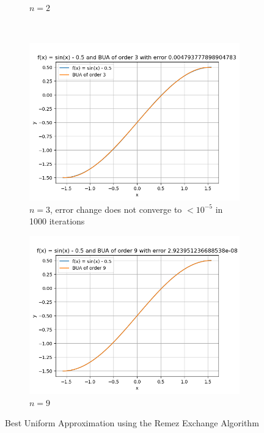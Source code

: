 \documentclass[conference,onecolumn]{IEEEtran}
\begin{document}
\begin{enumerate}[label=\arabic{enumi}.]
\begin{enumerate}
\begin{figure}[H]
\begin{subfigure}{0.49\linewidth}
                                    \caption{$n = 2$}
                              \end{subfigure} \\
                              \begin{subfigure}{0.49\linewidth}
                                    \centering
                                    \includegraphics[width=\linewidth]{figs/Q1_c_poly_3.png}
                                    \caption{$n = 3$, error change does not converge to $< 10^{-5}$ in 1000 iterations}
                              \end{subfigure}
                              \begin{subfigure}{0.49\linewidth}
                                    \centering
                                    \includegraphics[width=\linewidth]{figs/Q1_c_poly_9.png}
                                    \caption{$n = 9$}
                              \end{subfigure}
                              \caption{Best Uniform Approximation using the Remez Exchange Algorithm}
                        \end{figure}


\end{enumerate}
\end{enumerate}
\end{document}
